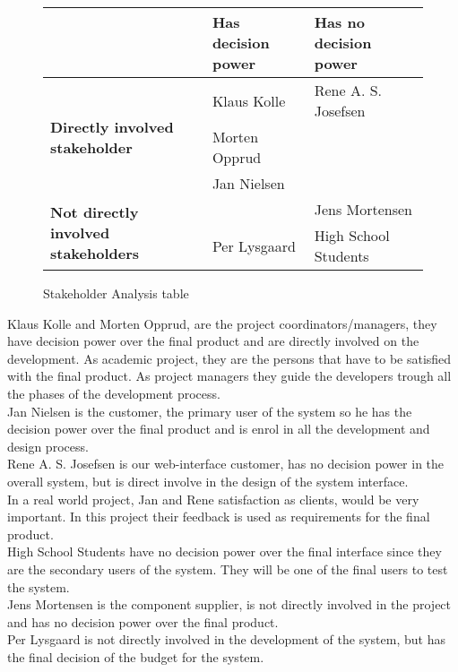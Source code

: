 \begin{figure}[h!]
 \begin{center}
  \begin{tabular}{| l | l | l |}
   \hline
    & \textbf{Has decision power} & \textbf{Has no decision power} \\ \hline
    \multirow{3}{*}{\textbf{Directly involved stakeholder}} 
    	& Klaus Kolle & Rene A. S. Josefsen\\ 
    	& Morten Opprud &  \\ 
    	& Jan Nielsen &  \\ \hline
    \multirow{2}{*}{\textbf{Not directly involved stakeholders}} 
    	&  & Jens Mortensen\\
    	& Per Lysgaard & High School Students \\ \hline
   \end{tabular}
  \end{center}
 \caption{Stakeholder Analysis table}
\end{figure}

Klaus Kolle and Morten Opprud, are the project coordinators/managers, they
have decision power over the final product and are directly involved on the development. As academic project, they are the persons that have to be satisfied with the final product. As project managers they guide the developers trough all the phases of the development process.\\

Jan Nielsen is the customer, the primary user of the system so he has the decision power over the final product and is enrol in all the development and design process. \\

Rene A. S. Josefsen is our web-interface customer, has no decision power in the overall system, but is direct involve in the design of the system interface.\\

In a real world project, Jan and Rene satisfaction as clients, would be very important. In this project their feedback is used as requirements for the final product.\\ 

High School Students have no decision power over the final interface since they are the secondary users of the system. They will be one of the final users to test the system.\\

Jens Mortensen is the component supplier, is not directly involved in the project and has no decision power over the final product.\\

Per Lysgaard is not directly involved in the development of the system, but has the final decision of the budget for the system.\\


